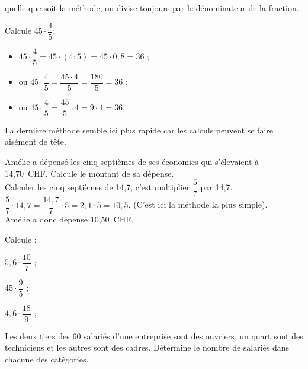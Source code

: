 \begin{methode*1}

\begin{remarque}
{\small quelle que soit la méthode, on divise toujours par le dénominateur de la fraction.}
 \end{remarque}

\begin{exemple*1}
Calcule $45 \cdot \dfrac{4}{5}$: \\[.4em]
\begin{itemize}
 \item $45 \cdot \dfrac{4}{5} = 45 \cdot (4 : 5) = 45 \cdot 0,8 = 36$ ;
 \item ou $45 \cdot \dfrac{4}{5} = \dfrac{45 \cdot 4}{5} = \dfrac{180}{5} = 36$ ;
 \item ou $45 \cdot \dfrac{4}{5} = \dfrac{45}{5} \cdot 4 = 9 \cdot 4 = 36$.
 \end{itemize}
 \end{exemple*1}

\begin{remarque}
{\small La dernière méthode semble ici plus rapide car les calculs peuvent se faire aisément de tête.}
 \end{remarque}
 
 
\begin{exemple*1}
Amélie a dépensé les cinq septièmes de ses économies qui s'élevaient à 14,70 CHF. Calcule le montant de sa dépense. \\[1em]
Calculer les cinq septièmes de 14,7, c'est multiplier $\dfrac{5}{7}$ par 14,7. \\[0.5em]
$\dfrac{5}{7} \cdot 14,7 = \dfrac{14,7}{7} \cdot 5 = 2,1 \cdot 5 = 10,5$. {\footnotesize(C'est ici la méthode la plus simple).}\\[0.3em]
Amélie a donc dépensé 10,50 CHF.
 \end{exemple*1}
 
\exercice
Calcule :
\begin{colenumerate}{3}
 \item $5,6 \cdot \dfrac{10}{7}$ ;
 \item $45 \cdot \dfrac{9}{5}$ ;
 \item $4,6 \cdot \dfrac{18}{9}$ ; 
 \end{colenumerate}

  \exercice
Les deux tiers des 60 salariés d'une entreprise sont des ouvriers, un quart sont des techniciens et les autres sont des cadres. Détermine le nombre de salariés dans chacune des catégories.

 \end{methode*1}

